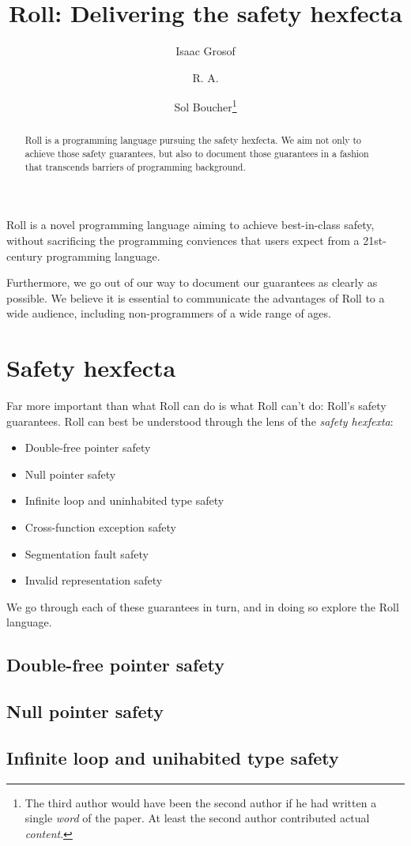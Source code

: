 \documentclass{article}
\title{Roll: Delivering the safety hexfecta}
\author{Isaac Grosof
\and
R. A.
\and
Sol Boucher\footnote{
The third author would have been the second author if he had written
a single \emph{word} of the paper.
At least the second author contributed actual \emph{content}.
}
}
\begin{document}
\maketitle
\begin{abstract}
Roll is a programming language pursuing the safety hexfecta.
We aim not only to achieve those safety guarantees,
but also to document those guarantees
in a fashion that transcends barriers of programming background.
\end{abstract}

Roll is a novel programming language aiming to achieve best-in-class safety,
without sacrificing the programming conviences that users expect from a
21st-century programming language.

Furthermore, we go out of our way to document our guarantees as clearly as possible.
We believe it is essential to communicate
the advantages of Roll to a wide audience,
including non-programmers of a wide range of ages.

\section{Safety hexfecta}

Far more important than what Roll can do
is what Roll can't do: Roll's safety guarantees.
Roll can best be understood through the lens of
the \emph{safety hexfexta}:

\begin{itemize}
\item Double-free pointer safety
\item Null pointer safety
\item Infinite loop and uninhabited type safety
\item Cross-function exception safety
\item Segmentation fault safety
\item Invalid representation safety
\end{itemize}
We go through each of these guarantees in turn, and in doing so explore the Roll language.
\subsection{Double-free pointer safety}
\subsection{Null pointer safety}
\subsection{Infinite loop and unihabited type safety}
\end{document}
